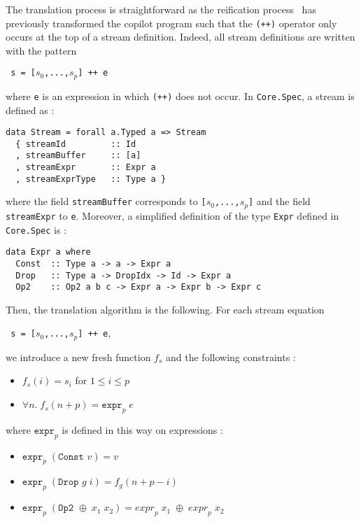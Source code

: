 The translation process is straightforward as the reification process~\cite{gill,pike-icfp-12} has previously transformed the copilot program such that the \texttt{(++)} operator only occurs at the top of a stream definition. Indeed, all stream definitions are written with the pattern
\begin{center}\texttt{ s = [$s_0$,...,$s_p$] ++ e}\end{center}
where \texttt{e} is an expression in which \texttt{(++)} does not occur. In \texttt{Core.Spec}, a stream is defined as :
\begin{lstlisting}[frame=single]
data Stream = forall a.Typed a => Stream
  { streamId         :: Id
  , streamBuffer     :: [a]
  , streamExpr       :: Expr a
  , streamExprType   :: Type a }
\end{lstlisting}
where the field \texttt{streamBuffer} corresponds to \texttt{[$s_0$,...,$s_p$]} and the field \texttt{streamExpr} to \texttt{e}. Moreover, a simplified definition of the type \texttt{Expr} defined in \texttt{Core.Spec} is :
\begin{lstlisting}[frame=single]
data Expr a where
  Const  :: Type a -> a -> Expr a
  Drop   :: Type a -> DropIdx -> Id -> Expr a
  Op2    :: Op2 a b c -> Expr a -> Expr b -> Expr c
\end{lstlisting}Then, the translation algorithm is the following. For each stream equation \begin{center}\texttt{ s = [$s_0$,...,$s_p$] ++ e},\end{center}we introduce a new fresh function $f_s$ and the following constraints :

\begin{itemize}
\item $f_s(i) = s_i$ \quad for $1 \leq i \leq p$
\item $\forall n . \; f_s(n + p) = \texttt{expr}_p \; e$
\end{itemize}
where $\texttt{expr}_p$ is defined in this way on expressions :
\begin{itemize}
\item $\texttt{expr}_p \; (\texttt{Const } v) = v$
\item $\texttt{expr}_p \; (\texttt{Drop } g \; i) = f_g(n + p - i)$
\item $\texttt{expr}_p \; (\texttt{Op2 } \oplus \; x_1 \; x_2) =  {expr}_p \; x_1 \; \oplus \; {expr}_p \; x_2 $
\end{itemize}





